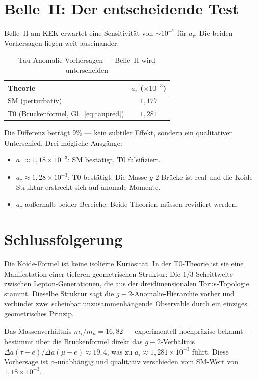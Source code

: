 \section{Belle~II: Der entscheidende Test}

Belle~II am KEK erwartet eine Sensitivität von $\sim 10^{-7}$ für $a_\tau$. Die beiden Vorhersagen liegen weit auseinander:

\begin{table}[h]
	\centering
	\begin{tabular}{lc}
		\toprule
		\textbf{Theorie} & $a_\tau$ ($\times 10^{-3}$) \\
		\midrule
		SM (perturbativ) & $1{,}177$ \\
		T0 (Brückenformel, Gl.~\ref{eq:taupred}) & $1{,}281$ \\
		\bottomrule
	\end{tabular}
	\caption{Tau-Anomalie-Vorhersagen — Belle~II wird unterscheiden}
\end{table}

Die Differenz beträgt $9\%$ — kein subtiler Effekt, sondern ein qualitativer Unterschied. Drei mögliche Ausgänge:
\begin{itemize}
	\item $a_\tau \approx 1{,}18 \times 10^{-3}$: SM bestätigt, T0 falsifiziert.
	\item $a_\tau \approx 1{,}28 \times 10^{-3}$: T0 bestätigt. Die Masse-$g$-$2$-Brücke ist real und die Koide-Struktur erstreckt sich auf anomale Momente.
	\item $a_\tau$ außerhalb beider Bereiche: Beide Theorien müssen revidiert werden.
\end{itemize}

\section{Schlussfolgerung}

Die Koide-Formel ist keine isolierte Kuriosität. In der T0-Theorie ist sie eine Manifestation einer tieferen geometrischen Struktur: Die $1/3$-Schrittweite zwischen Lepton-Generationen, die aus der dreidimensionalen Torus-Topologie stammt. Dieselbe Struktur sagt die $g-2$-Anomalie-Hierarchie vorher und verbindet zwei scheinbar unzusammenhängende Observable durch ein einziges geometrisches Prinzip.

Das Massenverhältnis $m_\tau/m_\mu = 16{,}82$ — experimentell hochpräzise bekannt — bestimmt über die Brückenformel direkt das $g-2$-Verhältnis $\Delta a(\tau{-}e)/\Delta a(\mu{-}e) \approx 19{,}4$, was zu $a_\tau \approx 1{,}281 \times 10^{-3}$ führt. Diese Vorhersage ist $\alpha$-unabhängig und qualitativ verschieden vom SM-Wert von $1{,}18 \times 10^{-3}$.

